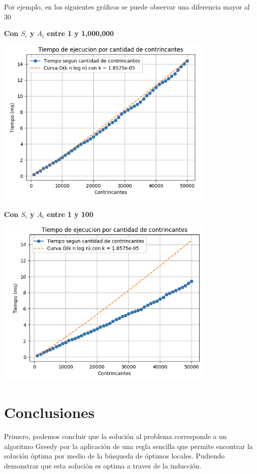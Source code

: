 \documentclass{estilo}
\begin{document}
Por ejemplo, en los siguientes gráficos se puede observar una diferencia mayor al 30%
\begin{center}
\textbf{Con $S_i$ y $A_i$ entre 1 y 1,000,000}

\includegraphics[width=0.8\textwidth]{img/VariationHigh.png}

\textbf{Con $S_i$ y $A_i$ entre 1 y 100}

\includegraphics[width=0.8\textwidth]{img/VariationLow.png}
\end{center}
\newpage
\section{Conclusiones}
Primero, podemos concluir que la solución al problema corresponde a un algoritmo Greedy por la aplicación de una regla sencilla que permite encontrar la solución óptima por medio de la búsqueda de óptimos locales. Pudiendo demonstrar que esta solución es optima a traves de la inducción.
\end{document}
